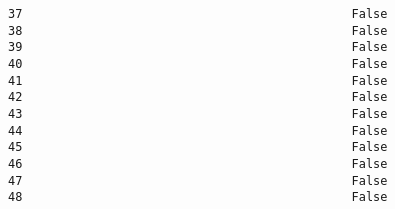 \documentclass[11pt]{article}
\begin{document}
\begin{Verbatim}[commandchars=\\\{\}]
37                                              False                                                                                      
38                                              False                                                                                      
39                                              False                                                                                      
40                                              False                                                                                      
41                                              False                                                                                      
42                                              False                                                                                      
43                                              False                                                                                      
44                                              False                                                                                      
45                                              False                                                                                      
46                                              False                                                                                      
47                                              False                                                                                      
48                                              False                                                                                      


\end{Verbatim}
\end{document}
